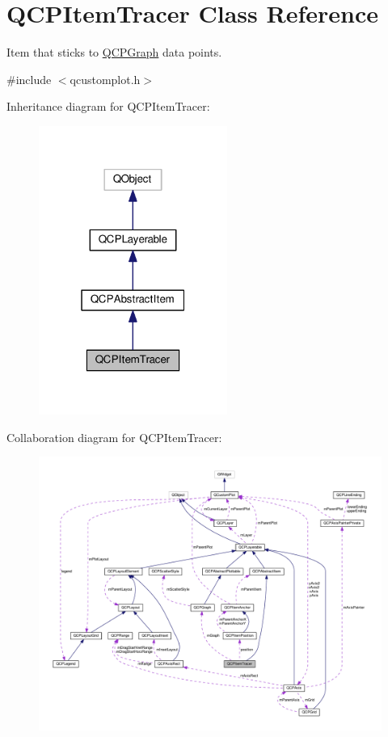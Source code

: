 \hypertarget{classQCPItemTracer}{}\section{Q\+C\+P\+Item\+Tracer Class Reference}
\label{classQCPItemTracer}


Item that sticks to \hyperlink{classQCPGraph}{Q\+C\+P\+Graph} data points.  




{\ttfamily \#include $<$qcustomplot.\+h$>$}



Inheritance diagram for Q\+C\+P\+Item\+Tracer\+:\nopagebreak
\begin{figure}[H]
\begin{center}
\leavevmode
\includegraphics[width=175pt]{classQCPItemTracer__inherit__graph}
\end{center}
\end{figure}


Collaboration diagram for Q\+C\+P\+Item\+Tracer\+:\nopagebreak
\begin{figure}[H]
\begin{center}
\leavevmode
\includegraphics[width=350pt]{classQCPItemTracer__coll__graph}
\end{center}
\end{figure}
